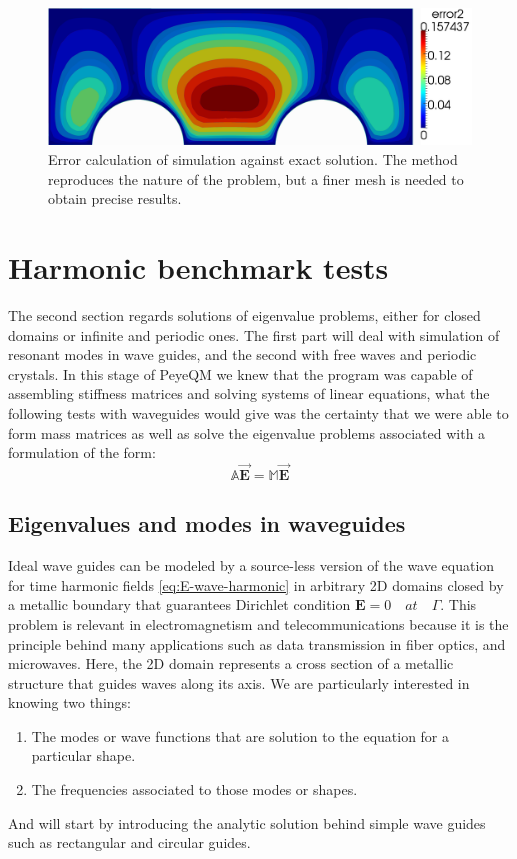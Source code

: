 \begin{figure}
\centering
\includegraphics[scale=0.4]{./img/two_cylinders_error.pdf}
\caption{Error calculation of simulation against exact solution. The method reproduces the nature of the problem, but a finer mesh is needed to obtain precise results.}
\label{fig:two_cylinders_error}
\end{figure}

\section{Harmonic benchmark tests}
The second section regards solutions of eigenvalue problems, either for closed domains or infinite and periodic ones. The first part will deal with simulation of resonant modes in wave guides, and the second with free waves and periodic crystals.
In this stage of PeyeQM we knew that the program was capable of assembling stiffness matrices and solving systems of linear equations, what the following tests with waveguides would give was the certainty that we were able to form mass matrices as well  as solve the eigenvalue problems associated with a formulation of the form:
$$\mathbb{A}\mathbf{\vec{E}} = \mathbb{M}\mathbf{\vec{E}}$$


\subsection{Eigenvalues and modes in waveguides}

Ideal wave guides can be modeled by a source-less version of the wave equation for time harmonic fields \ref{eq:E-wave-harmonic} in arbitrary 2D domains closed by a metallic boundary that guarantees Dirichlet condition $\mathbf{E} = 0\quad at\quad \Gamma$. This problem is relevant in electromagnetism and telecommunications because it is the principle behind many applications such as data transmission in fiber optics, and microwaves. Here, the 2D domain represents a cross section of a metallic structure that guides waves along its axis. We are particularly interested in knowing two things:
\begin{enumerate}
\item The modes or wave functions that are solution to the equation for a particular shape.
\item The frequencies associated to those modes or shapes. 
\end{enumerate}
And will start by introducing the analytic solution behind simple wave guides such as rectangular and circular guides.

